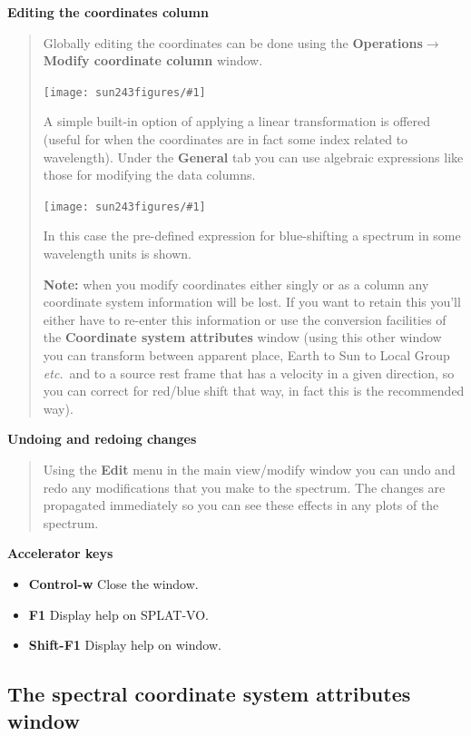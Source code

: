 \documentclass[twoside,11pt]{article}
\newcommand{\htmladdimg}[1]{}
\newcommand{\latexhtml}[2]{#1}
\renewcommand{\_}{\texttt{\symbol{95}}}
\newcommand{\SPLAT}{\textsf{SPLAT-VO}}
\newcommand{\mainfigure}[1]
{\begin{center}
 \latexhtml{\texttt{[image: sun243\_figures/\#1]}}{\htmladdimg{#1.gif}}
 \end{center}
}
\newcommand{\menuitem}[1]{\textbf{#1}}
\newcommand{\submenuitem}[2]{\latexhtml{\textbf{#1$\rightarrow$#2}}{\textbf{#1->#2}}}
\newcommand{\labelitem}[1]{\textbf{#1}}
\newcommand{\etc}{\textit{etc.}}
\newcommand{\subheading}[1]{\textbf{\large{#1}}}
\begin{document}
\subheading{Editing the coordinates column}
\begin{quote}
 Globally editing the coordinates can be done using the
 \submenuitem{Operations}{Modify coordinate column} window.

 \mainfigure{coordeditwindow}

 A simple built-in option of applying a linear transformation is
 offered (useful for when the coordinates are in fact some index
 related to wavelength). Under the \labelitem{General} tab you can
 use algebraic expressions like those for modifying the data columns.

 \mainfigure{coordeditwindow2}

 In this case the pre-defined expression for blue-shifting a spectrum
 in some wavelength units is shown.

 \labelitem{Note:} when you modify coordinates either singly or as a
 column any coordinate system information will be lost. If you want to
 retain this you'll either have to re-enter this information or use
 the conversion facilities of the \labelitem{Coordinate system
 attributes} window (using this other window you can transform between
 apparent place, Earth to Sun to Local Group \etc\ and to a source
 rest frame that has a velocity in a given direction, so you can
 correct for red/blue shift that way, in fact this is the recommended way).

\end{quote}

\subheading{Undoing and redoing changes}
\begin{quote}
Using the \menuitem{Edit} menu in the main view/modify window you can
undo and redo any modifications that you make to the spectrum. The
changes are propagated immediately so you can see these effects in any
plots of the spectrum.
\end{quote}

\subheading{Accelerator keys}

\begin{itemize}
\item \labelitem{Control-w} Close the window.
\item \labelitem{F1} Display help on \SPLAT.
\item \labelitem{Shift-F1} Display help on window.
\end{itemize}

\newpage
\subsection{The spectral coordinate system attributes window}
\end{document}

